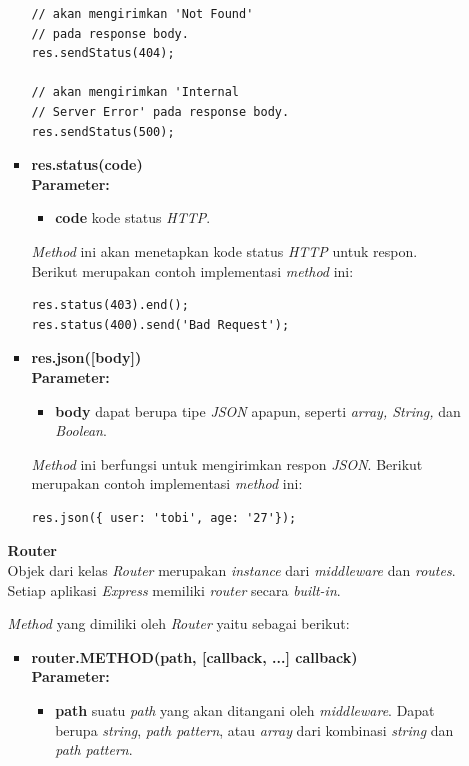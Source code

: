 \documentclass[a4paper,twoside]{article}
\begin{document}
\begin{enumerate}
\begin{enumerate}
\begin{itemize}
\begin{lstlisting}
// akan mengirimkan 'Not Found' 
// pada response body.
res.sendStatus(404); 
				
// akan mengirimkan 'Internal 
// Server Error' pada response body.
res.sendStatus(500); 
\end{lstlisting}
				
				\item \textbf{res.status(code)} \\ \textbf{Parameter:}
				\begin{itemize}
					\item \textbf{code} kode status \textit{HTTP}.
				\end{itemize}
				
				\textit{Method} ini akan menetapkan kode status \textit{HTTP} untuk respon. Berikut merupakan contoh implementasi \textit{method} ini:
\begin{lstlisting}
res.status(403).end();
res.status(400).send('Bad Request');
\end{lstlisting}
				
				\item \textbf{res.json([body])} \\ \textbf{Parameter:}
				\begin{itemize}
					\item \textbf{body} dapat berupa tipe \textit{JSON} apapun, seperti \textit{array, String,} dan \textit{Boolean}.
				\end{itemize}
				
				\textit{Method} ini berfungsi untuk mengirimkan respon \textit{JSON}. Berikut merupakan contoh implementasi \textit{method} ini:
\begin{lstlisting}
res.json({ user: 'tobi', age: '27'});
\end{lstlisting}
				
			\end{itemize}
			
			
			\textbf{Router} \\
			Objek dari kelas \textit{Router} merupakan \textit{instance} dari \textit{middleware} dan \textit{routes}. Setiap aplikasi \textit{Express} memiliki \textit{router} secara \textit{built-in}. 
			
			\textit{Method} yang dimiliki oleh \textit{Router} yaitu sebagai berikut:
			
			\begin{itemize}
				\item \textbf{router.METHOD(path, [callback, ...] callback)} \\ \textbf{Parameter:} \\ 
				\begin{itemize}
					\item \textbf{path} suatu \textit{path} yang akan ditangani oleh \textit{middleware}. Dapat berupa \textit{string}, \textit{path pattern}, atau \textit{array} dari kombinasi \textit{string} dan \textit{path pattern}.
					

\end{itemize}
\end{itemize}
\end{enumerate}
\end{enumerate}
\end{document}
